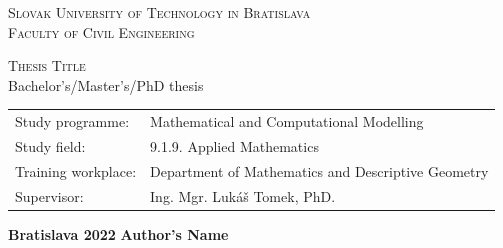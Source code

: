 \begin{center}
	\textsc{\LARGE
		Slovak University of Technology in Bratislava\\
		\vspace{10pt}
		Faculty of Civil Engineering}\\
	
	\vfill
	
	\textsc{\LARGE
		Thesis Title}\\ 
		\vspace{10pt}
	{\Large
		Bachelor's/Master's/PhD thesis}
\end{center}

\vfill

\noindent
\begin{tabular}{ll}
    Study programme: & Mathematical and Computational Modelling\\
	Study field: & 9.1.9. Applied Mathematics\\
	Training workplace:& Department of Mathematics and Descriptive Geometry\\
	Supervisor: & Ing. Mgr. Lukáš Tomek, PhD. \\
\end{tabular}

\vspace{0.1\textheight}

{\Large
	\noindent \textbf{Bratislava 2022}
	\hfill \textbf{Author's Name} %
}

\

